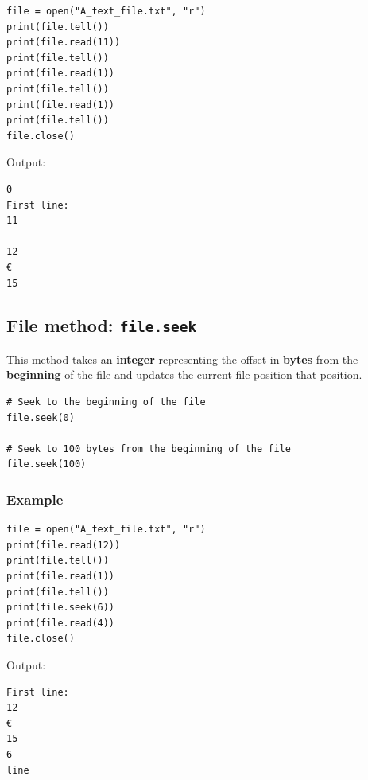 \documentclass[11pt]{article}
\begin{document}
\begin{verbatim}
file = open("A_text_file.txt", "r")
print(file.tell())
print(file.read(11))
print(file.tell())
print(file.read(1))
print(file.tell())
print(file.read(1))
print(file.tell())
file.close()
\end{verbatim}

 \noindent Output:

\begin{verbatim}
0
First line:
11
 
12
€
15
\end{verbatim}

\subsection{File method: \texttt{file.seek}}
\label{sec:org86398f4}
This method takes an \textbf{integer} representing the offset in \textbf{bytes} from the \textbf{beginning} of the file and updates the current file position that position.
\begin{verbatim}
# Seek to the beginning of the file
file.seek(0)

# Seek to 100 bytes from the beginning of the file
file.seek(100)
\end{verbatim}

\subsubsection{Example}
\label{sec:org7b3384d}
\begin{verbatim}
file = open("A_text_file.txt", "r")
print(file.read(12))
print(file.tell())
print(file.read(1))
print(file.tell())
print(file.seek(6))
print(file.read(4))
file.close()
\end{verbatim}

 \noindent Output:

\begin{verbatim}
First line: 
12
€
15
6
line
\end{verbatim}


 \newpage
\end{document}
